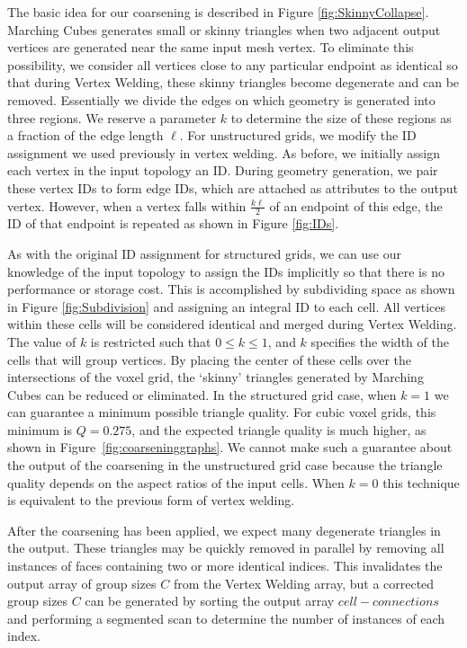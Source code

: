 \documentclass[review,journal]{vgtc}         %
\begin{document}
The basic idea for our coarsening is described in Figure \ref{fig:SkinnyCollapse}. Marching Cubes generates small or skinny triangles when two adjacent output vertices are generated near the same input mesh vertex. To eliminate this possibility, we consider all vertices close to any particular endpoint as identical so that during Vertex Welding, these skinny triangles become degenerate and can be removed. Essentially we divide the edges on which geometry is generated into three regions. We reserve a parameter $k$ to determine the size of these regions as a fraction of the edge length $\ell$. For unstructured grids, we modify the ID assignment we used previously in vertex welding. As before, we initially assign each vertex in the input topology an ID. During geometry generation, we pair these vertex IDs to form edge IDs, which are attached as attributes to the output vertex. However, when a vertex falls within $\frac{k\ell}{2}$ of an endpoint of this edge, the ID of that endpoint is repeated as shown in Figure \ref{fig:IDs}.

As with the original ID assignment for structured grids, we can use our knowledge of the input topology to assign the IDs implicitly so that there is no performance or storage cost. This is accomplished by subdividing space as shown in Figure \ref{fig:Subdivision} and assigning an integral ID to each cell. All vertices within these cells will be considered identical and merged during Vertex Welding. The value of $k$ is restricted such that $0\leq k \leq 1$, and $k$ specifies the width of the cells that will group vertices. By placing the center of these cells over the intersections of the voxel grid, the `skinny' triangles generated by Marching Cubes can be reduced or eliminated. In the structured grid case, when $k=1$ we can guarantee a minimum possible triangle quality. For cubic voxel grids, this minimum is $Q=0.275$, and the expected triangle quality is much higher, as shown in Figure~\ref{fig:coarseninggraphs}. We cannot make such a guarantee about the output of the coarsening in the unstructured grid case because the triangle quality depends on the aspect ratios of the input cells. When $k=0$ this technique is equivalent to the previous form of vertex welding.  

After the coarsening has been applied, we expect many degenerate triangles in the output. These triangles may be quickly removed in parallel by removing
all instances of faces containing two or more identical indices. This invalidates the output array of group sizes $C$ from the Vertex Welding array, but a corrected group sizes $C$ can be generated by sorting the output array $cell-connections$ and performing a segmented scan to determine the number of instances of each index.
\end{document}

